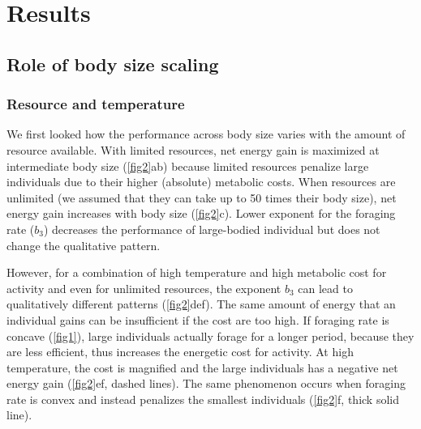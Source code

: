 \section*{Results}
\subsection*{Role of body size scaling}
\subsubsection*{Resource  and temperature}
We first looked how the performance across body size varies with the amount of resource available.
 With limited resources, net energy gain is maximized at intermediate body size (\cref{fig2}ab) because limited resources penalize large individuals due to their higher (absolute) metabolic costs. 
 When resources are unlimited (we assumed that they can take up to 50 times their body size), net energy gain increases with body size (\cref{fig2}c).
 Lower exponent for the foraging rate ($b_3$) decreases the performance of large-bodied individual but does not change the qualitative pattern.

However, for a combination of high temperature and high metabolic cost for activity and even for unlimited resources, the exponent $b_3$ can lead to qualitatively different patterns (\cref{fig2}def).
The same amount of energy that an individual gains can be insufficient if the cost are too high.
If foraging rate is concave (\cref{fig1}), large individuals actually forage for a longer period, because they are less efficient, thus increases the energetic cost for activity.
At high temperature, the cost is magnified and the large individuals has a negative net energy gain (\cref{fig2}ef, dashed lines).
The same phenomenon occurs when foraging rate is convex and instead penalizes the smallest individuals (\cref{fig2}f, thick solid line).
